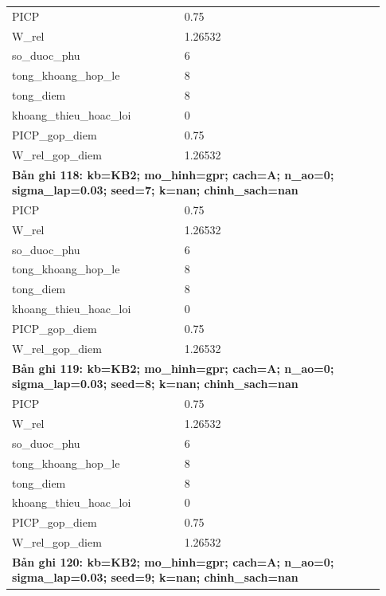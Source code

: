 \begin{longtable}{p{0.43\linewidth}p{0.50\linewidth}}
PICP & 0.75 \\
W\_\allowbreak rel & 1.26532 \\
so\_\allowbreak duoc\_\allowbreak phu & 6 \\
tong\_\allowbreak khoang\_\allowbreak hop\_\allowbreak le & 8 \\
tong\_\allowbreak diem & 8 \\
khoang\_\allowbreak thieu\_\allowbreak hoac\_\allowbreak loi & 0 \\
PICP\_\allowbreak gop\_\allowbreak diem & 0.75 \\
W\_\allowbreak rel\_\allowbreak gop\_\allowbreak diem & 1.26532 \\
\midrule
\multicolumn{2}{p{0.95\linewidth}}{\textbf{Bản ghi 118: kb=KB2; mo\_hinh=gpr; cach=A; n\_ao=0; sigma\_lap=0.03; seed=7; k=nan; chinh\_sach=nan}} \\
PICP & 0.75 \\
W\_\allowbreak rel & 1.26532 \\
so\_\allowbreak duoc\_\allowbreak phu & 6 \\
tong\_\allowbreak khoang\_\allowbreak hop\_\allowbreak le & 8 \\
tong\_\allowbreak diem & 8 \\
khoang\_\allowbreak thieu\_\allowbreak hoac\_\allowbreak loi & 0 \\
PICP\_\allowbreak gop\_\allowbreak diem & 0.75 \\
W\_\allowbreak rel\_\allowbreak gop\_\allowbreak diem & 1.26532 \\
\midrule
\multicolumn{2}{p{0.95\linewidth}}{\textbf{Bản ghi 119: kb=KB2; mo\_hinh=gpr; cach=A; n\_ao=0; sigma\_lap=0.03; seed=8; k=nan; chinh\_sach=nan}} \\
PICP & 0.75 \\
W\_\allowbreak rel & 1.26532 \\
so\_\allowbreak duoc\_\allowbreak phu & 6 \\
tong\_\allowbreak khoang\_\allowbreak hop\_\allowbreak le & 8 \\
tong\_\allowbreak diem & 8 \\
khoang\_\allowbreak thieu\_\allowbreak hoac\_\allowbreak loi & 0 \\
PICP\_\allowbreak gop\_\allowbreak diem & 0.75 \\
W\_\allowbreak rel\_\allowbreak gop\_\allowbreak diem & 1.26532 \\
\midrule
\multicolumn{2}{p{0.95\linewidth}}{\textbf{Bản ghi 120: kb=KB2; mo\_hinh=gpr; cach=A; n\_ao=0; sigma\_lap=0.03; seed=9; k=nan; chinh\_sach=nan}} \\

\end{longtable}
